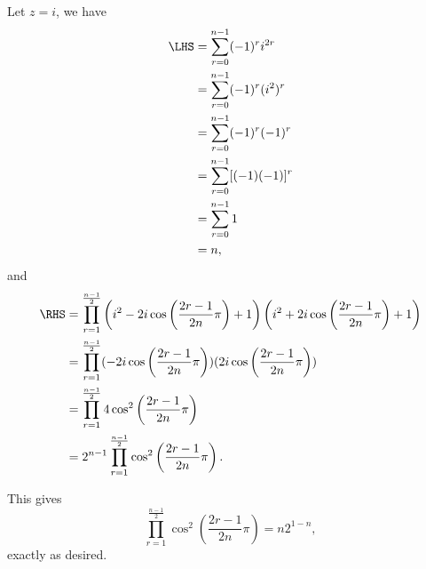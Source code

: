 \begin{enumerate}
          Let \(z = i\), we have
          \begin{align*}
              \LHS & = \sum_{r = 0}^{n - 1} (-1)^r i^{2r}  \\
                   & = \sum_{r = 0}^{n - 1} (-1)^r (i^2)^r \\
                   & = \sum_{r = 0}^{n - 1} (-1)^r (-1)^r  \\
                   & = \sum_{r = 0}^{n - 1} [(-1)(-1)]^r   \\
                   & = \sum_{r = 0}^{n - 1} 1              \\
                   & = n,
          \end{align*}
          and
          \begin{align*}
              \RHS & = \prod_{r = 1}^{\frac{n - 1}{2}} \left(i^2 - 2i \cos \left(\frac{2r - 1}{2n} \pi\right) + 1\right) \left(i^2 + 2i \cos \left(\frac{2r - 1}{2n} \pi\right) + 1\right) \\
                   & = \prod_{r = 1}^{\frac{n - 1}{2}} (-2i \cos \left(\frac{2r - 1}{2n} \pi\right)) (2i \cos \left(\frac{2r - 1}{2n} \pi\right))                                          \\
                   & = \prod_{r = 1}^{\frac{n - 1}{2}} 4 \cos^2 \left(\frac{2r - 1}{2n} \pi\right)                                                                                         \\
                   & = 2^{n - 1} \prod_{r = 1}^{\frac{n - 1}{2}} \cos^2 \left(\frac{2r - 1}{2n} \pi\right).
          \end{align*}

          This gives
          \[
              \prod_{r = 1}^{\frac{n - 1}{2}} \cos^2 \left(\frac{2r - 1}{2n} \pi\right) = n 2^{1 - n},
          \]
          exactly as desired.
\end{enumerate}